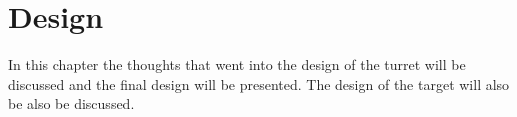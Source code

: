\chapter{Design}

In this chapter the thoughts that went into the design of the turret will be
discussed and the final design will be presented. The design of the target will
also be also be discussed.


